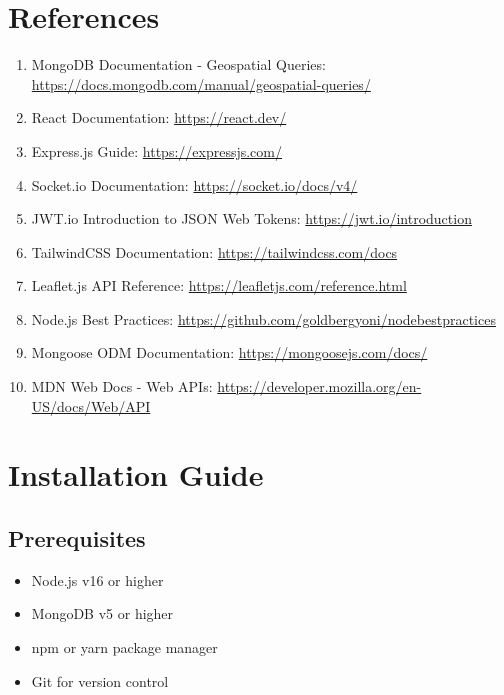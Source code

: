 \documentclass[12pt,a4paper]{article}
\begin{document}
\newpage

\section*{References}

\begin{enumerate}
    \item MongoDB Documentation - Geospatial Queries: \url{https://docs.mongodb.com/manual/geospatial-queries/}
    \item React Documentation: \url{https://react.dev/}
    \item Express.js Guide: \url{https://expressjs.com/}
    \item Socket.io Documentation: \url{https://socket.io/docs/v4/}
    \item JWT.io Introduction to JSON Web Tokens: \url{https://jwt.io/introduction}
    \item TailwindCSS Documentation: \url{https://tailwindcss.com/docs}
    \item Leaflet.js API Reference: \url{https://leafletjs.com/reference.html}
    \item Node.js Best Practices: \url{https://github.com/goldbergyoni/nodebestpractices}
    \item Mongoose ODM Documentation: \url{https://mongoosejs.com/docs/}
    \item MDN Web Docs - Web APIs: \url{https://developer.mozilla.org/en-US/docs/Web/API}
\end{enumerate}

\newpage

\appendix

\section{Installation Guide}

\subsection{Prerequisites}
\begin{itemize}
    \item Node.js v16 or higher
    \item MongoDB v5 or higher
    \item npm or yarn package manager
    \item Git for version control
\end{itemize}
\end{document}
